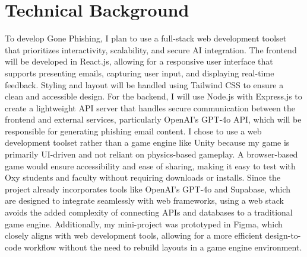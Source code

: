 \documentclass[10pt,twocolumn]{article}
\begin{document}
\section{Technical Background}
To develop Gone Phishing, I plan to use a full-stack web development toolset that prioritizes interactivity, scalability, and secure AI integration. The frontend will be developed in React.js, allowing for a responsive user interface that supports presenting emails, capturing user input, and displaying real-time feedback. Styling and layout will be handled using Tailwind CSS to ensure a clean and accessible design. For the backend, I will use Node.js with Express.js to create a lightweight API server that handles secure communication between the frontend and external services, particularly OpenAI’s GPT-4o API, which will be responsible for generating phishing email content.
I chose to use a web development toolset rather than a game engine like Unity because my game is primarily UI-driven and not reliant on physics-based gameplay. A browser-based game would ensure accessibility and ease of sharing, making it easy to test with Oxy students and faculty without requiring downloads or installs. Since the project already incorporates tools like OpenAI’s GPT-4o and Supabase, which are designed to integrate seamlessly with web frameworks, using a web stack avoids the added complexity of connecting APIs and databases to a traditional game engine. Additionally, my mini-project was prototyped in Figma, which closely aligns with web development tools, allowing for a more efficient design-to-code workflow without the need to rebuild layouts in a game engine environment.
\end{document}
